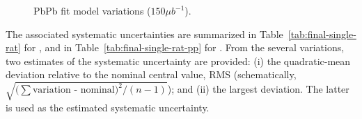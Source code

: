 \begin{figure}[hbtp]
\begin{center}
  \caption{PbPb fit model variations ($150 \mu b^{-1}$).}
  \label{fig:PbPb_model_variations}
  \end{center}
\end{figure}

The associated systematic uncertainties are summarized in Table~\ref{tab:final-single-rat} for \PbPb, and in Table~\ref{tab:final-single-rat-pp} for \pp.  
%
From the several variations, two estimates of the systematic uncertainty are provided: 
(i) the quadratic-mean deviation relative to the nominal central value, RMS (schematically, $\sqrt{(\sum{\text{variation - nominal})^2} / (n-1)}$); and (ii) the largest deviation. 
The latter is used as the estimated systematic uncertainty.

